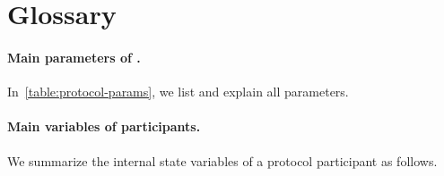 \section{Glossary}
\label{sec:glossary}

\paragraph{Main parameters of \timekeeper.}
%
In~\cref{table:protocol-params}, we list and explain all \timekeeper parameters.



\paragraph{Main variables of \timekeeper participants.}
%
We summarize the internal state variables of a protocol participant as follows.


